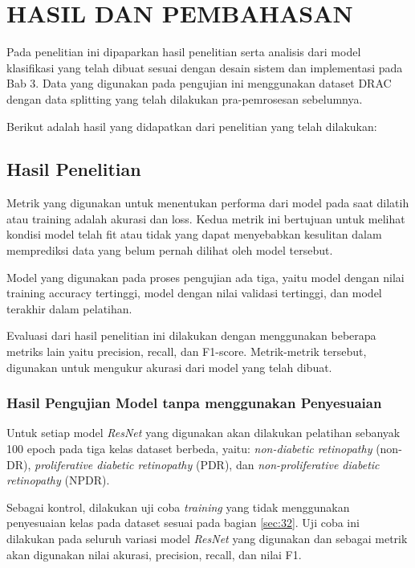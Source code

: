 \chapter{HASIL DAN PEMBAHASAN}
\label{chap:4}

Pada penelitian ini dipaparkan hasil penelitian serta analisis dari model klasifikasi yang telah dibuat sesuai dengan desain sistem dan implementasi pada Bab 3. Data yang digunakan pada pengujian ini menggunakan dataset DRAC dengan data splitting yang telah dilakukan pra-pemrosesan sebelumnya.

Berikut adalah hasil yang didapatkan dari penelitian yang telah dilakukan:

\section{Hasil Penelitian}
\label{sec:41}

Metrik yang digunakan untuk menentukan performa dari model pada saat dilatih atau training adalah akurasi dan loss. Kedua metrik ini bertujuan untuk melihat kondisi model telah fit atau tidak yang dapat menyebabkan kesulitan dalam memprediksi data yang belum pernah dilihat oleh model tersebut.

Model yang digunakan pada proses pengujian ada tiga, yaitu model dengan nilai training accuracy tertinggi, model dengan nilai validasi tertinggi, dan model terakhir dalam pelatihan.

Evaluasi dari hasil penelitian ini dilakukan dengan menggunakan beberapa metriks lain yaitu precision, recall, dan F1-score. Metrik-metrik tersebut, digunakan untuk mengukur akurasi dari model yang telah dibuat.

\subsection{Hasil Pengujian Model tanpa menggunakan Penyesuaian}
\label{sec:411}

Untuk setiap model \emph{ResNet} yang digunakan akan dilakukan pelatihan sebanyak 100 epoch pada tiga kelas dataset berbeda, yaitu: \emph{non-diabetic retinopathy} (non-DR), \emph{proliferative diabetic retinopathy} (PDR), dan \emph{non-proliferative diabetic retinopathy} (NPDR).


Sebagai kontrol, dilakukan uji coba \emph{training} yang tidak menggunakan penyesuaian kelas pada dataset sesuai pada bagian \ref{sec:32}. Uji coba ini dilakukan pada seluruh variasi model \emph{ResNet} yang digunakan dan sebagai metrik akan digunakan nilai akurasi, precision, recall, dan nilai F1.

